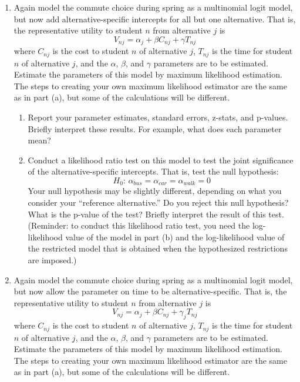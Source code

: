 \documentclass[11pt,letterpaper]{article}
\begin{document}
\begin{enumerate}[label=\alph*., leftmargin=*]
	\item Again model the commute choice during spring as a multinomial logit model, but now add alternative-specific intercepts for all but one alternative. That is, the representative utility to student $n$ from alternative $j$ is
	$$V_{nj} = \alpha_j + \beta C_{nj} + \gamma T_{nj}$$
	where $C_{nj}$ is the cost to student $n$ of alternative $j$, $T_{nj}$ is the time for student $n$ of alternative $j$, and the $\alpha$, $\beta$, and $\gamma$ parameters are to be estimated. Estimate the parameters of this model by maximum likelihood estimation. The steps to creating your own maximum likelihood estimator are the same as in part (a), but some of the calculations will be different. 

	\begin{enumerate}[label=\roman*.]
		\item Report your parameter estimates, standard errors, z-stats, and p-values. Briefly interpret these results. For example, what does each parameter mean?

		\item Conduct a likelihood ratio test on this model to test the joint significance of the alternative-specific intercepts. That is, test the null hypothesis:
		$$H_0 \text{: } \alpha_{bus} = \alpha_{car} = \alpha_{walk} = 0$$
		Your null hypothesis may be slightly different, depending on what you consider your ``reference alternative.'' Do you reject this null hypothesis? What is the p-value of the test? Briefly interpret the result of this test. (Reminder: to conduct this likelihood ratio test, you need the log-likelihood value of the model in part (b) and the log-likelihood value of the restricted model that is obtained when the hypothesized restrictions are imposed.)
	\end{enumerate}
	
	\item Again model the commute choice during spring as a multinomial logit model, but now allow the parameter on time to be alternative-specific. That is, the representative utility to student $n$ from alternative $j$ is
	$$V_{nj} = \alpha_j + \beta C_{nj} + \gamma_j T_{nj}$$
	where $C_{nj}$ is the cost to student $n$ of alternative $j$, $T_{nj}$ is the time for student $n$ of alternative $j$, and the $\alpha$, $\beta$, and $\gamma$ parameters are to be estimated. Estimate the parameters of this model by maximum likelihood estimation. The steps to creating your own maximum likelihood estimator are the same as in part (a), but some of the calculations will be different.


\end{enumerate}
\end{document}
